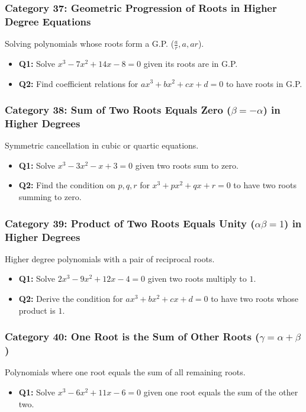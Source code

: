 \documentclass[10pt,a4paper]{article}
\begin{document}
\subsubsection{Category 37: Geometric Progression of Roots in Higher Degree Equations}
Solving polynomials whose roots form a G.P. ($\frac{a}{r}, a, ar$).
\begin{itemize}[leftmargin=*]
    \item \textbf{Q1:} Solve $x^3 - 7x^2 + 14x - 8 = 0$ given its roots are in G.P.
    \item \textbf{Q2:} Find coefficient relations for $ax^3 + bx^2 + cx + d = 0$ to have roots in G.P.
\end{itemize}

\subsubsection{Category 38: Sum of Two Roots Equals Zero ($\beta = -\alpha$) in Higher Degrees}
Symmetric cancellation in cubic or quartic equations.
\begin{itemize}[leftmargin=*]
    \item \textbf{Q1:} Solve $x^3 - 3x^2 - x + 3 = 0$ given two roots sum to zero.
    \item \textbf{Q2:} Find the condition on $p, q, r$ for $x^3 + px^2 + qx + r = 0$ to have two roots summing to zero.
\end{itemize}

\subsubsection{Category 39: Product of Two Roots Equals Unity ($\alpha\beta = 1$) in Higher Degrees}
Higher degree polynomials with a pair of reciprocal roots.
\begin{itemize}[leftmargin=*]
    \item \textbf{Q1:} Solve $2x^3 - 9x^2 + 12x - 4 = 0$ given two roots multiply to $1$.
    \item \textbf{Q2:} Derive the condition for $ax^3 + bx^2 + cx + d = 0$ to have two roots whose product is $1$.
\end{itemize}

\subsubsection{Category 40: One Root is the Sum of Other Roots ($\gamma = \alpha + \beta$)}
Polynomials where one root equals the sum of all remaining roots.
\begin{itemize}[leftmargin=*]
    \item \textbf{Q1:} Solve $x^3 - 6x^2 + 11x - 6 = 0$ given one root equals the sum of the other two.
\end{itemize}
\end{document}
